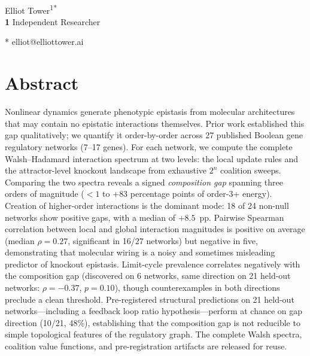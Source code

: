 \documentclass[10pt,letterpaper]{article}
\begin{document}
\vspace*{0.2in}

\begin{flushleft}
{\Large
\textbf{}
}
\newline
\\
Elliot Tower\textsuperscript{1*}
\\
\bigskip
\textbf{1} Independent Researcher
\\
\bigskip

* elliot@elliottower.ai

\end{flushleft}

\section*{Abstract}
Nonlinear dynamics generate phenotypic epistasis from molecular
architectures that may contain no epistatic interactions themselves.
Prior work established this gap qualitatively; we quantify it
order-by-order across 27 published Boolean gene regulatory networks
(7--17 genes). For each network, we compute the complete
Walsh--Hadamard interaction spectrum at two levels: the local update
rules and the attractor-level knockout landscape from exhaustive
$2^n$ coalition sweeps. Comparing the two spectra reveals a signed
\emph{composition gap} spanning three orders of magnitude ($< 1$ to
$+83$ percentage points of order-3+ energy). Creation of higher-order
interactions is the dominant mode: 18 of 24 non-null networks show
positive gaps, with a median of $+8.5$~pp. Pairwise Spearman
correlation between local and global interaction magnitudes is positive
on average (median $\rho = 0.27$, significant in 16/27 networks) but
negative in five, demonstrating that molecular wiring is a noisy and
sometimes misleading predictor of knockout epistasis. Limit-cycle
prevalence correlates negatively with the composition gap
(discovered on 6 networks, same direction on 21 held-out networks:
$\rho = -0.37$, $p = 0.10$), though counterexamples in both
directions preclude a clean threshold. Pre-registered structural
predictions on 21 held-out networks---including a feedback loop ratio
hypothesis---perform at chance on gap direction (10/21, 48\%),
establishing that the composition gap is not reducible to simple
topological features of the regulatory graph. The complete Walsh
spectra, coalition value functions, and pre-registration artifacts
are released for reuse.
\end{document}
